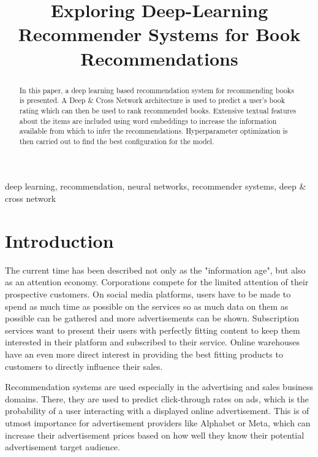 \documentclass[10pt,final,journal,a4paper,oneside,twocolumn]{IEEEtran}
\begin{document}
\title{Exploring Deep-Learning Recommender Systems for Book Recommendations}

\author{
}

\maketitle

\begin{abstract}
In this paper, a deep learning based recommendation system for recommending books is presented. A Deep \& Cross Network architecture is used to predict a user's book rating which can then be used to rank recommended books. Extensive textual features about the items are included using word embeddings to increase the information available from which to infer the recommendations. Hyperparameter optimization is then carried out to find the best configuration for the model.
\end{abstract}

\begin{IEEEkeywords}
deep learning, recommendation, neural networks, recommender systems, deep \& cross network
\end{IEEEkeywords}

\section{Introduction}
The current time has been described not only as the "information age", but also as an attention economy. Corporations compete for the limited attention of their prospective customers. On social media platforms, users have to be made to spend as much time as possible on the services so as much data on them as possible can be gathered and more advertisements can be shown. Subscription services want to present their users with perfectly fitting content to keep them interested in their platform and subscribed to their service. Online warehouses have an even more direct interest in providing the best fitting products to customers to directly influence their sales.

Recommendation systems are used especially in the advertising and sales business domains. There, they are used to predict click-through rates on ads, which is the probability of a user interacting with a displayed online advertisement. This is of utmost importance for advertisement providers like Alphabet or Meta, which can increase their advertisement prices based on how well they know their potential advertisement target audience. 
\end{document}
